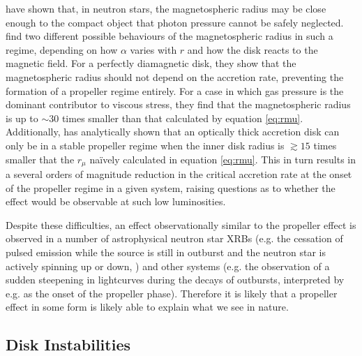 \par \citet{White_MRad} have shown that, in neutron stars, the magnetospheric radius may be close enough to the compact object that photon pressure cannot be safely neglected.  \citeauthor{White_MRad} find two different possible behaviours of the magnetospheric radius in such a regime, depending on how $\alpha$ varies with $r$ and how the disk reacts to the magnetic field.  For a perfectly diamagnetic disk, they show that the magnetospheric radius should not depend on the accretion rate, preventing the formation of a propeller regime entirely.  For a case in which gas pressure is the dominant contributor to viscous stress, they find that the magnetospheric radius is up to $\sim30$ times smaller than that calculated by equation \ref{eq:rmu}.  Additionally, \citet{Ertan_Prop} has analytically shown that an optically thick accretion disk can only be in a stable propeller regime when the inner disk radius is $\gtrsim15$ times smaller that the $r_\mu$ na\"ively calculated in equation \ref{eq:rmu}.  This in turn results in a several orders of magnitude reduction in the critical accretion rate at the onset of the propeller regime in a given system, raising questions as to whether the effect would be observable at such low luminosities.
\par Despite these difficulties, an effect observationally similar to the propeller effect is observed in a number of astrophysical neutron star XRBs (e.g. the cessation of pulsed emission while the source is still in outburst and the neutron star is actively spinning up or down, \citealp{Fabian_Propex,Furst_Propex}) and other systems (e.g. the observation of a sudden steepening in lightcurves during the decays of outbursts, interpreted by e.g. \citealp{Campana_PropBorder} as the onset of the propeller phase).  Therefore it is likely that a propeller effect in some form is likely able to explain what we see in nature.

\subsection{Disk Instabilities}

\label{sec:diskinstab}

